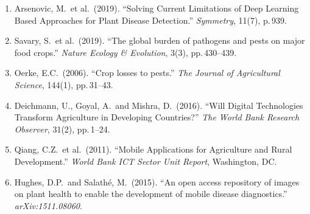 \documentclass[12pt,a4paper]{article}
\begin{document}
\begin{enumerate}[leftmargin=2em]
  \item Arsenovic, M.\ et al.\ (2019). ``Solving Current Limitations of Deep Learning Based Approaches for Plant Disease Detection.'' \textit{Symmetry}, 11(7), p.\,939.

  \item Savary, S.\ et al.\ (2019). ``The global burden of pathogens and pests on major food crops.'' \textit{Nature Ecology \& Evolution}, 3(3), pp.\,430--439.

  \item Oerke, E.C.\ (2006). ``Crop losses to pests.'' \textit{The Journal of Agricultural Science}, 144(1), pp.\,31--43.

  \item Deichmann, U., Goyal, A.\ and Mishra, D.\ (2016). ``Will Digital Technologies Transform Agriculture in Developing Countries?'' \textit{The World Bank Research Observer}, 31(2), pp.\,1--24.

  \item Qiang, C.Z.\ et al.\ (2011). ``Mobile Applications for Agriculture and Rural Development.'' \textit{World Bank ICT Sector Unit Report}, Washington, DC.

  \item Hughes, D.P.\ and Salath\'{e}, M.\ (2015). ``An open access repository of images on plant health to enable the development of mobile disease diagnostics.'' \textit{arXiv:1511.08060}.
\end{enumerate}
\end{document}
